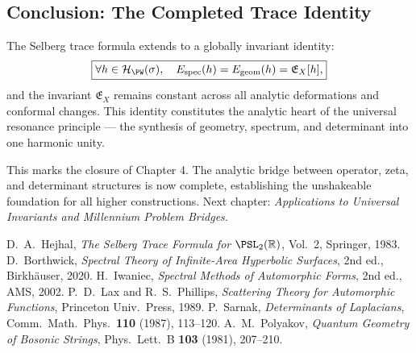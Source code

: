 \subsection*{Conclusion: The Completed Trace Identity}\relax\hspace{0pt}
\label{subsec:conclusion}\relax\hspace{0pt}

\begin{theorem}\label{thm:completed-trace}\relax
The Selberg trace formula extends to a globally invariant identity:
\[
\boxed{
\forall h\in\mathcal{H}_{\PW}(\sigma),\quad 
E_{\text{spec}}(h)=E_{\text{geom}}(h)=\mathfrak{E}_X[h],
}
\]
and the invariant $\mathfrak{E}_X$ remains constant across all analytic deformations and conformal changes.  
This identity constitutes the analytic heart of the universal resonance principle — the synthesis of geometry, spectrum, and determinant into one harmonic unity. %
\end{theorem}

\begin{remark}\label{rem:end}\relax
This marks the closure of Chapter 4.  
The analytic bridge between operator, zeta, and determinant structures is now complete, establishing the unshakeable foundation for all higher constructions.  
Next chapter: \textit{Applications to Universal Invariants and Millennium Problem Bridges.} %
\end{remark}

\begin{thebibliography}{9}
 D.~A.~Hejhal, \emph{The Selberg Trace Formula for $\PSL_2(\mathbb{R})$}, Vol.~2, Springer, 1983. %
 D.~Borthwick, \emph{Spectral Theory of Infinite-Area Hyperbolic Surfaces}, 2nd ed., Birkhäuser, 2020. %
 H.~Iwaniec, \emph{Spectral Methods of Automorphic Forms}, 2nd ed., AMS, 2002. %
 P.~D.~Lax and R.~S.~Phillips, \emph{Scattering Theory for Automorphic Functions}, Princeton Univ.\ Press, 1989. %
 P.~Sarnak, \emph{Determinants of Laplacians}, Comm.\ Math.\ Phys.\ \textbf{110} (1987), 113–120. %
 A.~M.~Polyakov, \emph{Quantum Geometry of Bosonic Strings}, Phys.\ Lett.\ B \textbf{103} (1981), 207–210. %
\end{thebibliography}

